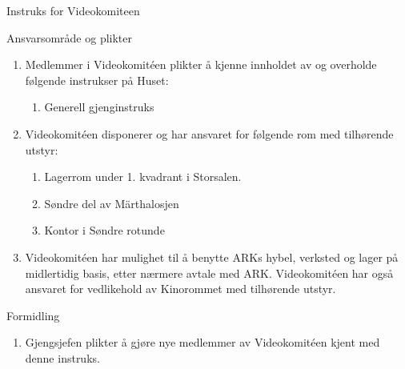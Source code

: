 \begin{instruks*}{Instruks for Videokomiteen}
     \begin{instruksledd}{Ansvarsområde og plikter}
        \begin{enumerate}
           \item Medlemmer i Videokomit\'een plikter å kjenne innholdet av og overholde følgende
                instrukser på Huset:
                \begin{enumerate} 
                    \item Generell gjenginstruks
                \end{enumerate}
            \item Videokomit\'een disponerer og har ansvaret for følgende rom med tilhørende utstyr:
                \begin{enumerate}
                    \item Lagerrom under 1. kvadrant i Storsalen.
                    \item Søndre del av Märthalosjen
                    \item Kontor i Søndre rotunde
                \end{enumerate}
            \item Videokomit\'een har mulighet til å benytte ARKs hybel, verksted og lager på midlertidig
            basis, etter nærmere
            avtale med ARK. Videokomit\'een har også ansvaret for vedlikehold av Kinorommet med
            tilhørende utstyr.
        \end{enumerate}
    \end{instruksledd}

    \begin{instruksledd}{Formidling}
        \begin{enumerate}
            \item Gjengsjefen plikter å gjøre nye medlemmer av Videokomit\'een kjent med
                denne instruks.
        \end{enumerate}
    \end{instruksledd}


\end{instruks*}

